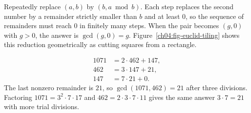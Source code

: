 Repeatedly replace $(a, b)$ by $(b, a \bmod b)$. Each step replaces the second number by a
remainder strictly smaller than $b$ and at least $0$, so the sequence of remainders must reach $0$
in finitely many steps. When the pair becomes $(g, 0)$ with $g > 0$, the answer is
$\gcd(g, 0) = g$. Figure~\ref{ch04:fig-euclid-tiling} shows this reduction geometrically as cutting
squares from a rectangle.

\begin{example}
\label{ch04:ex-gcd-1071}
\begin{align*}
1071 &= 2 \cdot 462 + 147, \\
 462 &= 3 \cdot 147 + 21, \\
 147 &= 7 \cdot 21 + 0.
\end{align*}
The last nonzero remainder is $21$, so $\gcd(1071, 462) = 21$ after three divisions. Factoring
$1071 = 3^2 \cdot 7 \cdot 17$ and $462 = 2 \cdot 3 \cdot 7 \cdot 11$ gives the same answer
$3 \cdot 7 = 21$ with more trial divisions.
\end{example}

